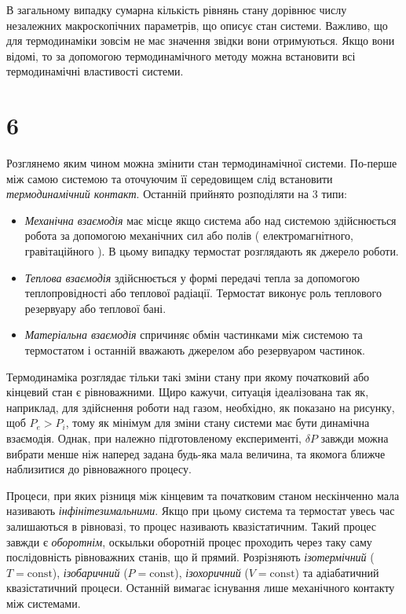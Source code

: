 В загальному випадку сумарна кількість рівнянь стану дорівнює числу незалежних макроскопічних параметрів, що описує стан системи. Важливо, що для термодинаміки зовсім не має значення звідки вони отримуються. Якщо вони відомі, то за допомогою термодинамічного методу можна встановити всі термодинамічні властивості системи.



\section{6}




Розглянемо яким чином можна змінити стан термодинамічної системи. По-перше між самою системою та оточуючим її середовищем слід встановити \emph{термодинамічний контакт}. Останній прийнято розподіляти на $3$ типи:

\begin{itemize}
    \item \emph{Механічна взаємодія} має місце якщо система або над системою здійснюється робота за допомогою механічних сил або полів ( електромагнітного, гравітаційного ). В цьому випадку термостат розглядають як джерело роботи.

    \item \emph{Теплова взаємодія} здійснюється у формі передачі тепла за допомогою теплопровідності або теплової радіації. Термостат виконує роль теплового резервуару або теплової бані.

    \item \emph{Матеріальна взаємодія} спричиняє обмін частинками між системою та термостатом і останній вважають джерелом або резервуаром частинок.
\end{itemize}

Термодинаміка розглядає тільки такі зміни стану при якому початковий або кінцевий стан є рівноважними. Щиро кажучи, ситуація ідеалізована так як, наприклад, для здійснення роботи над газом, необхідно, як показано на рисунку, щоб $P_e > P_i$, тому як мінімум для зміни стану системи має бути динамічна взаємодія. Однак, при належно підготовленому експерименті, $\delta P$ завжди можна вибрати менше ніж наперед задана будь-яка мала величина, та якомога ближче наблизитися  до рівноважного процесу.

Процеси, при яких різниця між кінцевим та початковим станом нескінченно мала називають \emph{інфінітезимальними}. Якщо при цьому система та термостат увесь час залишаються в рівновазі, то процес називають квазістатичним. Такий процес завжди є \emph{оборотнім}, оскыльки оборотній процес проходить через таку саму послідовність рівноважних станів, що й прямий. Розрізняють \emph{ізотермічний} ($T = \mathrm{const}$), \emph{ізобаричний} ($P = \mathrm{const}$),  \emph{ізохоричний} ($V = \mathrm{const}$) та адіабатичний квазістатичний процеси. Останній вимагає існування лише механічного контакту між системами.


